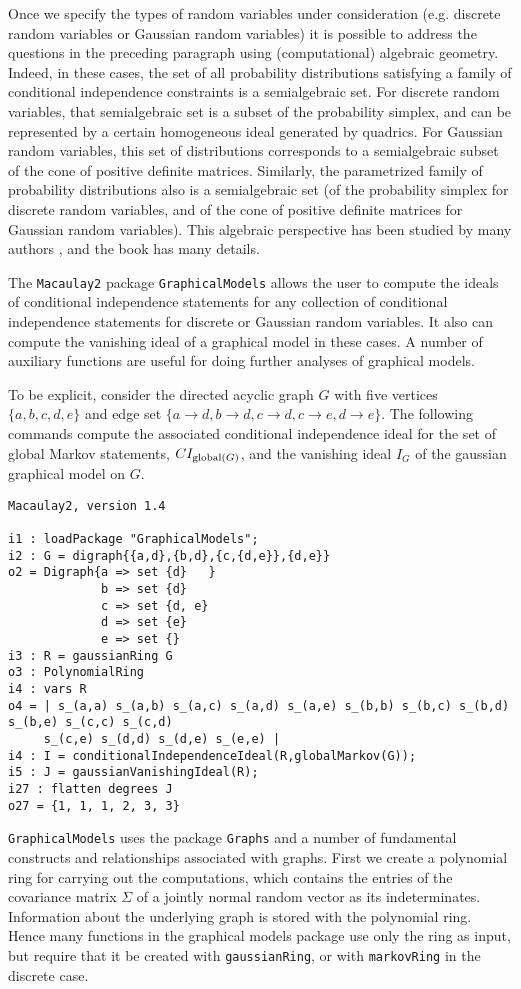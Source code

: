 \documentclass[letterpaper]{article}
\theoremstyle{definition}
\begin{document}
Once we specify the types of random variables under consideration
(e.g. discrete random variables or Gaussian random variables) it
is possible to address the questions in the preceding paragraph
using (computational) algebraic geometry.  Indeed, in these cases,
the set of all probability distributions satisfying a family of 
conditional independence constraints is a semialgebraic set.
For discrete random variables, that semialgebraic set is a subset
of the probability simplex, and can be represented by a certain
homogeneous ideal generated by quadrics.  For Gaussian random variables,
this set of distributions corresponds to a semialgebraic subset
of the cone of positive definite matrices.  Similarly,
the parametrized family of probability distributions also
is a semialgebraic set (of the probability simplex for discrete
random variables, and of the cone of positive definite matrices
for Gaussian random variables).  This algebraic perspective
has been studied by many authors \cite{}, and the book \cite{DSS}
has many details.

The {\tt Macaulay2} package {\tt GraphicalModels} allows the user to compute
the ideals of conditional independence statements for any collection
of conditional independence statements for discrete or Gaussian
random variables.  It also can compute the vanishing ideal of 
a graphical model in these cases.  A number of auxiliary functions
are useful for doing further analyses of graphical models.

To be explicit, consider the directed acyclic graph $G$ with  five
vertices $\{a,b,c,d,e\}$ and edge
set $\{a \to d, b \to d, c \to d, c \to e, d \to e\}$.
The following commands compute the associated conditional
independence ideal for the set of global Markov statements,
$CI_{{\rm global}(G)}$, and 
the vanishing ideal $I_{G}$ of the gaussian graphical model on $G$.

\begin{verbatim}
Macaulay2, version 1.4

i1 : loadPackage "GraphicalModels";
i2 : G = digraph{{a,d},{b,d},{c,{d,e}},{d,e}} 
o2 = Digraph{a => set {d}   }
             b => set {d}
             c => set {d, e}
             d => set {e}
             e => set {}
i3 : R = gaussianRing G
o3 : PolynomialRing
i4 : vars R
o4 = | s_(a,a) s_(a,b) s_(a,c) s_(a,d) s_(a,e) s_(b,b) s_(b,c) s_(b,d) s_(b,e) s_(c,c) s_(c,d)
     s_(c,e) s_(d,d) s_(d,e) s_(e,e) |
i4 : I = conditionalIndependenceIdeal(R,globalMarkov(G));
i5 : J = gaussianVanishingIdeal(R);
i27 : flatten degrees J
o27 = {1, 1, 1, 2, 3, 3}
\end{verbatim}
 {\tt GraphicalModels} uses the package {\tt Graphs} and a number of fundamental constructs and relationships 
associated with graphs.  First we create a polynomial ring
for carrying out the computations, which contains the entries of
the covariance matrix $\Sigma$ of a jointly normal random vector
as its indeterminates.  Information about the underlying graph is stored with the polynomial ring. 
Hence many functions in the graphical models package use only the ring as input, but require that it be created with {\tt gaussianRing}, or with {\tt markovRing} in the discrete case.
\end{document}
